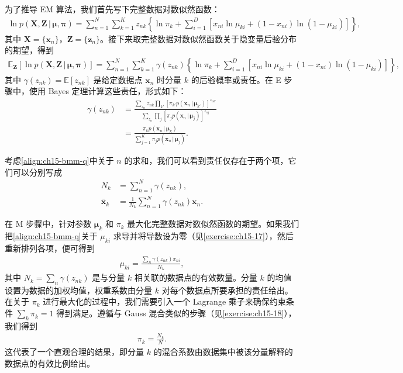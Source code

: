 \documentclass[../../main.tex]{subfiles}
\begin{document}
为了推导 EM 算法，我们首先写下完整数据对数似然函数：
\begin{align}
\ln p(\bm{X},\bm{Z}\,|\,\bm{\mu},\bm{\pi})=\sum_{n=1}^{N}\sum_{k=1}^{K}z_{nk}\!\left\{\ln\pi_k+\sum_{i=1}^{D}\left[x_{ni}\ln\mu_{ki}+(1-x_{ni})\ln(1-\mu_{ki})\right]\right\},
\label{align:ch15-bmm-complete-nll}
\end{align}
其中 $\bm{X}=\{\bm{x}_n\}$，$\bm{Z}=\{\bm{z}_n\}$。接下来取完整数据对数似然函数关于隐变量后验分布的期望，得到
\begin{align}
\mathbb{E}_{\bm{Z}}\!\left[\ln p(\bm{X},\bm{Z}\,|\,\bm{\mu},\bm{\pi})\right]=\sum_{n=1}^{N}\sum_{k=1}^{K}\gamma(z_{nk})\!\left\{\ln\pi_k+\sum_{i=1}^{D}\left[x_{ni}\ln\mu_{ki}+(1-x_{ni})\ln(1-\mu_{ki})\right]\right\},
\label{align:ch15-bmm-q}
\end{align}
其中 $\gamma(z_{nk})=\mathbb{E}[z_{nk}]$ 是给定数据点 $\bm{x}_n$ 时分量 $k$ 的后验概率或责任。在 E 步骤中，使用 Bayes 定理计算这些责任，形式如下：
\begin{align}
\gamma(z_{nk})
&=\frac{\sum_{z_n}z_{nk}\prod_{k'}\left[\pi_{k'}p(\bm{x}_n\,|\,\bm{\mu}_{k'})\right]^{z_{nk'}}}{\sum_{z_n}\prod_{j}\left[\pi_j p(\bm{x}_n\,|\,\bm{\mu}_j)\right]^{z_{nj}}}\nonumber\\
&=\frac{\pi_k p(\bm{x}_n\,|\,\bm{\mu}_k)}{\sum_{j=1}^{K}\pi_j p(\bm{x}_n\,|\,\bm{\mu}_j)}.
\label{align:ch15-bmm-responsibility}
\end{align}

考虑\eqref{align:ch15-bmm-q}中关于 $n$ 的求和，我们可以看到责任仅存在于两个项，它们可以分别写成
\begin{align}
N_k&=\sum_{n=1}^{N}\gamma(z_{nk}),
\label{align:ch15-bmm-nk}\\
\bar{\bm{x}}_k&=\frac{1}{N_k}\sum_{n=1}^{N}\gamma(z_{nk})\bm{x}_n.
\label{align:ch15-bmm-xbar}
\end{align}

在 M 步骤中，针对参数 $\bm{\mu}_k$ 和 $\pi_k$ 最大化完整数据对数似然函数的期望。如果我们把\eqref{align:ch15-bmm-q}关于 $\mu_{ki}$ 求导并将导数设为零（见\cref{exercise:ch15-17}），然后重新排列各项，便可得到
\begin{align}
\mu_{ki}=\frac{\sum_n\gamma(z_{nk})x_{ni}}{N_k},
\label{align:ch15-bmm-mu}
\end{align}
其中 $N_k=\sum_n\gamma(z_{nk})$ 是与分量 $k$ 相关联的数据点的有效数量。分量 $k$ 的均值设置为数据的加权均值，权重系数由分量 $k$ 对每个数据点所要承担的责任给出。在关于 $\pi_k$ 进行最大化的过程中，我们需要引入一个 Lagrange 乘子来确保约束条件 $\sum_k\pi_k=1$ 得到满足。遵循与 Gauss 混合类似的步骤（见\cref{exercise:ch15-18}），我们得到
\begin{align}
\pi_k=\frac{N_k}{N}.
\label{align:ch15-bmm-pi}
\end{align}
这代表了一个直观合理的结果，即分量 $k$ 的混合系数由数据集中被该分量解释的数据点的有效比例给出。
\end{document}
